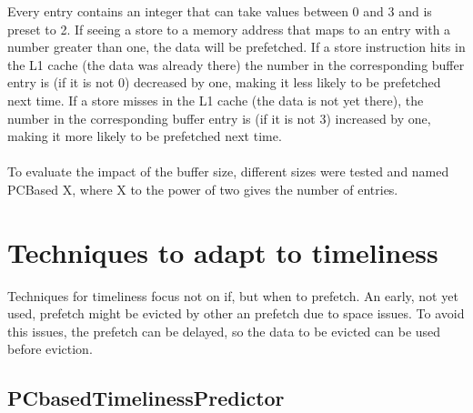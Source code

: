 Every entry contains an integer that can take values between 0 and 3 and is preset to 2. If seeing a store to a memory address that maps to an entry with a number greater than one, the data will be prefetched. If a store instruction hits in the L1
cache (the data was already there) the number in the corresponding buffer entry is (if it is not 0) decreased by one, making it less likely to be prefetched next time. If a store misses in the L1 cache (the data is not yet there), the number in the corresponding buffer entry is (if it is not 3) increased by one, making it more likely to be prefetched next time. \\ \\


To evaluate the impact of the buffer size, different sizes were tested and named PCBased X, where X to the power of two gives the number of entries.



\section{Techniques to adapt to timeliness} 
Techniques for timeliness focus not on if, but when to prefetch. An early, not yet used, prefetch might be evicted by other an prefetch due to space issues. To
avoid this issues, the prefetch can be delayed, so the data to be evicted can be used
before eviction.
\subsection{PCbasedTimelinessPredictor}

